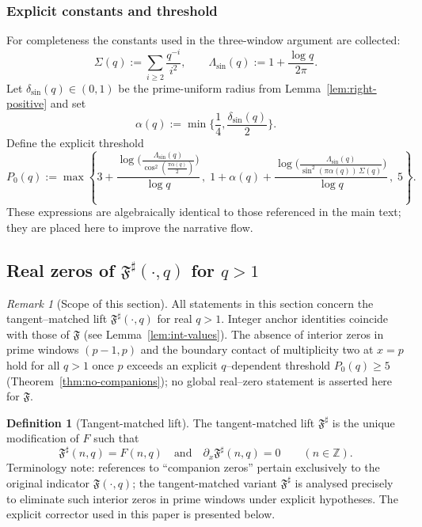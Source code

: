 \documentclass[11pt,a4paper]{amsart}
\newcommand{\F}{F}
\newcommand{\Fbase}{\mathfrak F}
\newcommand{\Fsharp}{\Fbase^{\sharp}}
\theoremstyle{plain}
\theoremstyle{definition}
\newtheorem{definition}[theorem]{Definition}
\theoremstyle{remark}
\newtheorem{remark}[theorem]{Remark}
\begin{document}
\subsubsection*{Explicit constants and threshold}\label{subsec:explicit-constants}
For completeness the constants used in the three-window argument are collected:
\[
\Sigma(q):=\sum_{i\ge2}\frac{q^{-i}}{i^2},\qquad
\Lambda_{\sin}(q):=1+\frac{\log q}{2\pi}.
\]
Let $\delta_{\sin}(q)\in(0,1)$ be the prime-uniform radius from Lemma~\ref{lem:right-positive} and set
\[
\alpha(q):=\min\Big\{\frac{1}{4},\frac{\delta_{\sin}(q)}{2}\Big\}.
\]
Define the explicit threshold
\[
P_0(q):=\max\!\left\{
3+\frac{\log\!\Big(\frac{\Lambda_{\sin}(q)}{\cos^2(\frac{\pi\alpha(q)}{2})}\Big)}{\log q}\,,\;
1+\alpha(q)+\frac{\log\!\Big(\frac{\Lambda_{\sin}(q)}{\sin^2(\pi\alpha(q))\,\Sigma(q)}\Big)}{\log q}\,,\;
5\right\}.
\]
These expressions are algebraically identical to those referenced in the main text; they are placed here to improve the narrative flow.


\subsection{Real zeros of \texorpdfstring{$\Fsharp(\cdot,q)$}{Fsharp} for \texorpdfstring{$q>1$}{q>1}}
\label{sec:real-zeros-fsharp}

\begin{remark}[Scope of this section]\label{rem:scope-fsharp}
All statements in this section concern the tangent–matched lift $\Fsharp(\cdot,q)$ for real $q>1$. Integer anchor identities coincide with those of $\mathfrak F$ (see Lemma~\ref{lem:int-values}). The absence of interior zeros in prime windows $(p-1,p)$ and the boundary contact of multiplicity two at $x=p$ hold for all $q>1$ once $p$ exceeds an explicit $q$–dependent threshold $P_0(q)\ge 5$ (Theorem~\ref{thm:no-companions}); no global real–zero statement is asserted here for $\mathfrak F$.
\end{remark}

\begin{definition}[Tangent-matched lift]\label{def:tangent-matched}
The tangent-matched lift $\Fsharp$ is the unique modification of $\F$ such that
\[
\Fsharp(n,q)=\F(n,q)\quad\text{and}\quad \partial_x\Fsharp(n,q)=0\qquad(n\in\mathbb Z).
\]
Terminology note: references to “companion zeros” pertain exclusively to the original indicator $\mathfrak F(\cdot,q)$; the tangent-matched variant $\Fsharp$ is analysed precisely to eliminate such interior zeros in prime windows under explicit hypotheses.
The explicit corrector used in this paper is presented below.
\end{definition}
\end{document}
